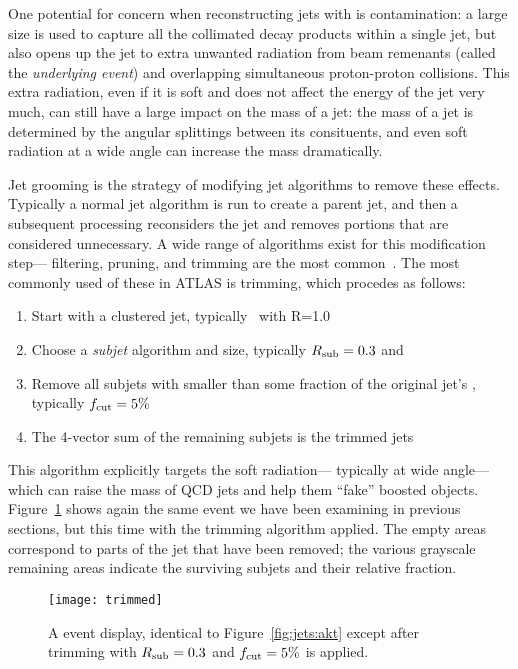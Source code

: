 One potential for concern when reconstructing jets with \largeR is contamination: a large size is used to capture all the collimated decay products within a single jet, but also opens up the jet to extra unwanted radiation from beam remenants (called the \textit{underlying event}) and overlapping simultaneous proton-proton collisions. This extra radiation, even if it is soft and does not affect the energy of the jet very much, can still have a large impact on the mass of a jet: the mass of a jet is determined by the angular splittings between its consituents, and even soft radiation at a wide angle can increase the mass dramatically.

Jet grooming is the strategy of modifying jet algorithms to remove these effects. Typically a normal jet algorithm is run to create a parent jet, and then a subsequent processing reconsiders the jet and removes portions that are considered unnecessary. A wide range of algorithms exist for this modification step--- filtering, pruning, and trimming are the most common~\cite{BDRS,Krohn:2009th,Ellis:2009me}. The most commonly used of these in ATLAS is trimming, which procedes as follows:
%
\begin{enumerate}
\item Start with a clustered \largeR jet, typically \antikt\ with R=1.0
\item Choose a \textit{subjet} algorithm and size, typically $R_{\rm sub} = 0.3$ and \kt
\item Remove all subjets with \pt smaller than some fraction \fcut of the original jet's \pt, typically $f_{\rm cut}  = 5\%$
\item The 4-vector sum of the remaining subjets is the trimmed jets
\end{enumerate}
%
This algorithm explicitly targets the soft radiation--- typically at wide angle--- which can raise the mass of QCD jets and help them ``fake'' boosted objects. Figure~\ref{fig:jets:trimmed} shows again the same event we have been examining in previous sections, but this time with the trimming algorithm applied. The empty areas correspond to parts of the jet that have been removed; the various grayscale remaining areas indicate the surviving subjets and their relative \pt fraction. 



\begin{figure}
\centering
\texttt{[image: trimmed]}
\label{fig:jets:trimmed}
\caption{A event display, identical to Figure~\ref{fig:jets:akt} except after trimming with $R_{\rm sub} = 0.3$ and $f_{\rm cut} = 5\%$ is applied.}
\end{figure}

